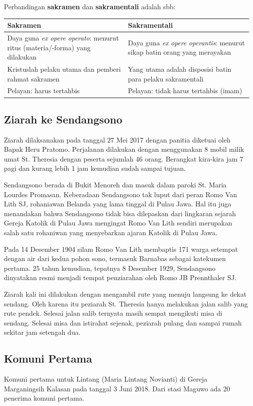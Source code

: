 Perbandingan \textbf{sakramen} dan \textbf{sakramentali} adalah sbb:

\small
\begin{tabular}{|p{}|p{}|}
	\hline
	Sakramen & Sakramentali\\ \hline
	Daya guna \textit{ex opere operato}: menurut ritus (materia/-forma) yang dilakukan &
	Daya guna \textit{ex opere operantis}: menurut sikap batin orang yang merayakan\\ \hline
	Kristuslah pelaku utama dan pemberi rahmat sakramen &
	Yang utama adalah disposisi batin para pelaku sakramentali \\ \hline
	Pelayan: harus tertahbis & Pelayan: tidak harus tertahbis (imam) \\ \hline
\end{tabular}	
\normalsize


\subsection*{Ziarah ke Sendangsono}
Ziarah dilaksanakan pada tanggal 27 Mei 2017 dengan panitia diketuai oleh Bapak Heru Pratomo. Perjalanan dilakukan dengan menggunakan 8 mobil milik umat St. Theresia dengan peserta sejumlah 46 orang. Berangkat kira-kira jam 7 pagi dan kurang lebih 1 jam kemudian sudah sampai tujuan.

Sendangsono berada di Bukit Menoreh dan masuk dalam paroki St. Maria Lourdes Promasan. Keberadaan Sendangsono tak luput dari peran Romo Van Lith SJ, rohaniawan Belanda yang lama tinggal di Pulau Jawa. Hal itu juga menandakan bahwa Sendangsono tidak bisa dilepaskan dari lingkaran sejarah Gereja Katolik di Pulau Jawa mengingat Romo Van Lith sendiri merupakan salah satu rohaniwan yang menyebarkan ajaran Katolik di Pulau Jawa.

Pada 14 Desember 1904 silam Romo Van Lith membaptis 171 warga setempat dengan air dari kedua pohon sono, termasuk Barnabas sebagai katekumen pertama. 25 tahun kemudian, tepatnya 8 Desember 1929, Sendangsono dinyatakan resmi menjadi tempat penziarahan oleh Romo JB Prennthaler SJ.

Ziarah kali ini dilakukan dengan mengambil rute yang menuju langsung ke dekat sendang. Oleh karena itu peziarah St. Theresia hanya melakukan jalan salib yang rute pendek. Selesai jalan salib ternyata masih sempat mengikuti misa di sendang. Selesai misa dan istirahat sejenak, peziarah pulang dan sampai rumah sekitar jam setengah dua.


\subsection*{Komuni Pertama}
Komuni pertama untuk Lintang (Maria Lintang Novianti) di Gereja Marganingsih Kalasan pada tanggal 3 Juni 2018. Dari stasi Maguwo ada 20 penerima komuni pertama.

